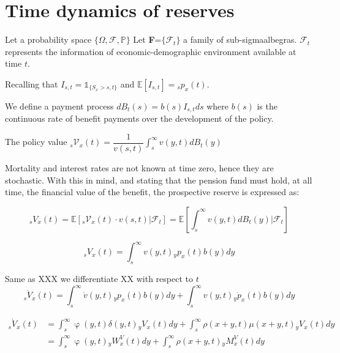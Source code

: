 \documentclass[12pt]{article}
\begin{document}
\FloatBarrier
\section{Time dynamics of reserves}\label{sec:5_Reserves}


Let a probability space $\{\Omega, \mathcal{F}, \mathbb{P}\}$
Let \textbf{F}=$\{\mathcal{F}_t\}$ a family of sub-sigmaalbegras. $\mathcal{F}_t$ represents the information of economic-demographic environment available at time $t$.

Recalling that $I_{s,t}=\mathds{1}_{\{S_x>s,t\}}$ and  $\mathbb{E}[I_{s,t}]={}_sp_x(t)$.

We define a payment process $dB_t(s)=b(s)I_{s,t}ds$ where $b(s)$ is the continuous rate of benefit payments over the development of the policy. 



The policy value ${}_s\mathcal{V}_x(t)=\dfrac{1}{v(s,t)}\int_s^\infty v(y,t)dB_t(y)$

Mortality and interest rates are not known at time zero, hence they are stochastic. With this in mind, and stating that the pension fund must hold, at all time, the financial value of the benefit, the prospective reserve is expressed as:

\begin{equation}\label{eq:Reserve1}
	{}_sV_x(t)=\mathbb{E}[{}_s\mathcal{V}_x(t)\cdot v(s,t)|\mathcal{F}_t]=\mathbb{E}[\int_s^\infty v(y,t)dB_t(y)|\mathcal{F}_t]
\end{equation}



\begin{equation}\label{eq:Reserve2}
{}_sV_x(t)=\int_s^\infty v(y,t){}_yp_x(t)b(y)dy
\end{equation}

Same as XXX we differentiate XX with respect to $t$
\begin{equation}\label{eq:DifferentiateReserveT}
{}_s\dot{V}_x(t)=\int_s^\infty  \dot{v}(y,t){}_yp_x(t)b(y)dy+\int_s^\infty v(y,t){}_y\dot{p}_x(t)b(y)dy
\end{equation}

\begin{equation}\label{eq:DifferentiateReserveT2}
	\begin{split}
			{}_s\dot{V}_x(t)&=\int_s^\infty  \upvarphi(y,t) \delta(y,t){}_yV_x(t)dy+\int_s^\infty \rho(x+y,t) \mu(x+y,t){}_yV_x(t)dy \\
		&=\int_s^\infty  \upvarphi(y,t) {}_yW^V_x(t)dy+\int_s^\infty \rho(x+y,t) {}_yM^V_x(t)dy
	\end{split}
\end{equation}
\end{document}
